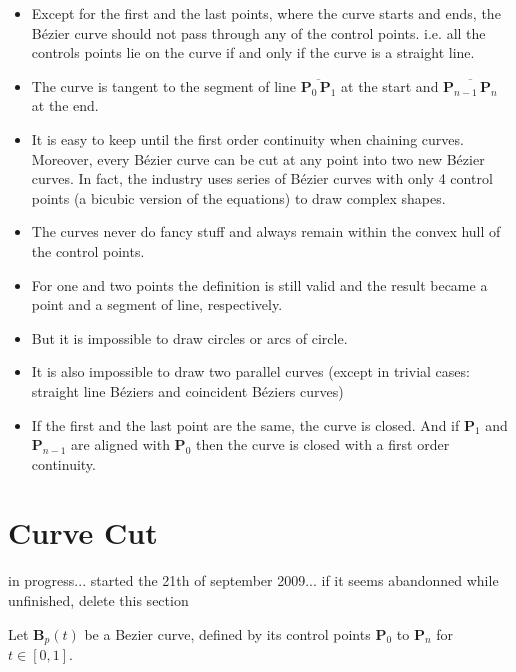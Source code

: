 \documentclass{article}
\providecommand{\PP}{\mathbf{P}}
\providecommand{\PB}{\mathbf{B}}
\begin{document}
\begin{itemize}
\item Except for the first and the last points, where the curve starts and ends, the B\'ezier curve should not pass through any of the control points. i.e. all the controls points lie on the curve if and only if the curve is a straight line.

\item The curve is tangent to the segment of line $\overline{\PP_0 \, \PP_1}$ at the start and $\overline{\PP_{n-1} \, \PP_n}$ at the end.

\item It is easy to keep until the first order continuity when chaining curves. Moreover, every B\'ezier curve can be cut at any point into two new B\'ezier curves. In fact, the  industry uses series of B\'ezier curves with only 4 control points (a bicubic version of the equations) to draw complex shapes.

\item The curves never do fancy stuff and always remain within the convex hull of the control points.

\item For one and two points the definition is still valid and the result became a point and a segment of line, respectively.

\item But it is impossible to draw circles or arcs of circle.

\item It is also impossible to draw two parallel curves (except in trivial cases: straight line B\'eziers and coincident B\'eziers curves)

\item If the first and the last point are the same, the curve is closed. And if $\PP_1$ and $\PP_{n-1}$ are aligned with $\PP_0$ then the curve is closed with a first order continuity.

\end{itemize}

\section{Curve Cut}
 in progress... started the 21th of september 2009... if it seems abandonned while unfinished, delete this section

Let $\PB_p(t)$ be a Bezier curve, defined by its control points $\PP_0$ to $\PP_{n}$ for $t \in [0,1]$.
\end{document}
